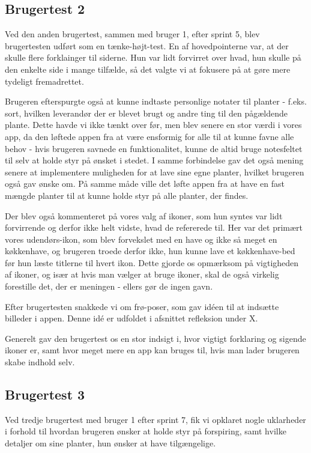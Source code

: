 \subsection{Brugertest 2}

Ved den anden brugertest, sammen med bruger 1, efter sprint 5, blev brugertesten udført som en tænke-højt-test. En af hovedpointerne var, at der skulle flere forklainger til siderne. Hun var lidt forvirret over hvad, hun skulle på den enkelte side i mange tilfælde, så det valgte vi at fokusere på at gøre mere tydeligt fremadrettet.

Brugeren efterspurgte også at kunne indtaste personlige notater til planter - f.eks. sort, hvilken leverandør der er blevet brugt og andre ting til den pågældende plante. Dette havde vi ikke tænkt over før, men blev senere en stor værdi i vores app, da den løftede appen fra at være ensformig for alle til at kunne favne alle behov - hvis brugeren savnede en funktionalitet, kunne de altid bruge notesfeltet til selv at holde styr på ønsket i stedet. I samme forbindelse gav det også mening senere at implementere muligheden for at lave sine egne planter, hvilket brugeren også gav ønske om. På samme måde ville det løfte appen fra at have en fast mængde planter til at kunne holde styr på alle planter, der findes.

Der blev også kommenteret på vores valg af ikoner, som hun syntes var lidt forvirrende og derfor ikke helt vidste, hvad de refererede til. Her var det primært vores udendørs-ikon, som blev forvekslet med en have og ikke så meget en køkkenhave, og brugeren troede derfor ikke, hun kunne lave et køkkenhave-bed før hun læste titlerne til hvert ikon. Dette gjorde os opmærksom på vigtigheden af ikoner, og især at hvis man vælger at bruge ikoner, skal de også virkelig forestille det, der er meningen - ellers gør de ingen gavn.

Efter brugertesten snakkede vi om frø-poser, som gav idéen til at indsætte billeder i appen. Denne idé er udfoldet i afsnittet refleksion under X.

Generelt gav den brugertest os en stor indsigt i, hvor vigtigt forklaring og sigende ikoner er, samt hvor meget mere en app kan bruges til, hvis man lader brugeren skabe indhold selv.

\subsection{Brugertest 3}

Ved tredje brugertest med bruger 1 efter sprint 7, fik vi opklaret nogle uklarheder i forhold til hvordan brugeren ønsker at holde styr på forspiring, samt hvilke detaljer om sine planter, hun ønsker at have tilgængelige.

